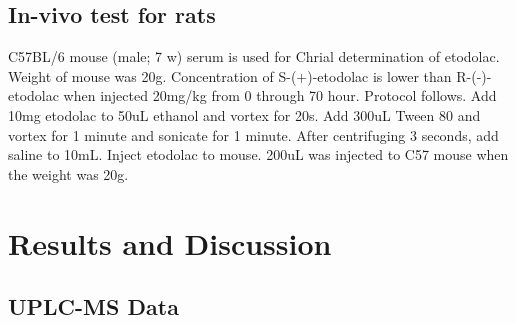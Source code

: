 \documentclass[12pt]{article} %
\begin{document}
\subsection {In-vivo test for rats}
 C57BL/6 mouse (male; 7 w) serum is used for Chrial determination of \linebreak etodolac. Weight of mouse was 20g. Concentration of S-(+)-etodolac is lower than R-(-)-etodolac when injected 20mg/kg from 0 through 70 hour.\cite{cite2}
  Protocol follows. Add 10mg etodolac to 50uL ethanol and vortex for 20s. Add 300uL Tween 80 and vortex for 1 minute and sonicate for 1 minute. After centrifuging 3 seconds, add saline to 10mL. Inject etodolac to mouse.
  200uL was injected to C57 mouse when the weight was 20g.


  

\newpage

\section {Results and Discussion}

\subsection {UPLC-MS Data}
\end{document}
